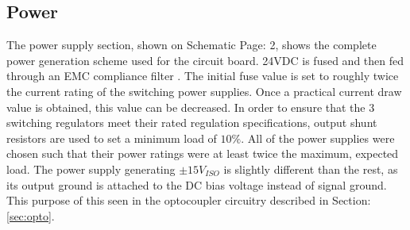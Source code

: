\subsection {Power}
The power supply section, shown on Schematic Page: 2, shows the complete power generation scheme used for the circuit board. 24VDC is fused and then fed through an EMC compliance filter \cite{5VswitchDatasheet}. The initial fuse value is set to roughly twice the current rating of the switching power supplies. Once a practical current draw value is obtained, this value can be decreased. In order to ensure that the 3 switching regulators meet their rated regulation specifications, output shunt resistors are used to set a minimum load of $10\%$. All of the power supplies were chosen such that their power ratings were at least twice the maximum, expected load. The power supply generating $\pm 15V_{ISO}$ is slightly different than the rest, as its output ground is attached to the DC bias voltage instead of signal ground. This purpose of this seen in the optocoupler circuitry described in Section: \ref{sec:opto}.  

